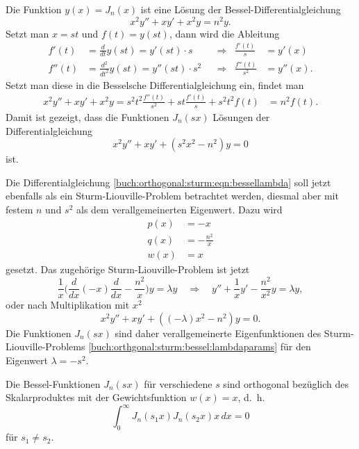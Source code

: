 Die Funktion $y(x) = J_n(x)$ ist eine Lösung der Bessel-Differentialgleichung
\[
x^2y'' + xy' + x^2y = n^2y.
\]
Setzt man $x=s t$ und $f(t)=y(s t)$, dann wird die Ableitung 
\[
\begin{aligned}
f'(t)
&=
\frac{d}{dt}y(s t)
=
y'(s t) \cdot s
&&\Rightarrow
&
\frac{f'(t)}{s}
&=
y'(x)
\\
f''(t)
&=
\frac{d^2}{dt^2} y(s t)
=
y''(s t) \cdot s^2
&&\Rightarrow
&
\frac{f''(t)}{s^2}
&=
y''(x).
\end{aligned}
\]
Setzt man diese in die Besselsche Differentialgleichung ein,
findet man
\begin{align*}
x^2y''+xy'+x^2y
=
s^2 t^2 \frac{f''(t)}{s^2}
+
s t \frac{f'(t)}{s}
+
s^2 t^2 f(t)
&=
n^2 f(t).
\end{align*}
Damit ist gezeigt, dass die Funktionen $J_n(s x)$ Lösungen
der Differentialgleichung
\begin{equation}
x^2y'' + xy' + (s^2 x^2  - n^2) y = 0
\label{buch:orthogonal:sturm:eqn:bessellambda}
\end{equation}
ist.

Die Differentialgleichung
\eqref{buch:orthogonal:sturm:eqn:bessellambda}
soll jetzt ebenfalls als ein Sturm-Liouville-Problem betrachtet
werden, diesmal aber mit festem $n$ und $s^2$ als dem verallgemeinerten
Eigenwert.
Dazu wird
\begin{equation}
\begin{aligned}
p(x) &= -x \\
q(x) &= -\frac{n^2}{x} \\
w(x) &= x
\end{aligned}
\label{buch:orthgonal:sturm:bessel:lambdaparams}
\end{equation}
gesetzt.
Das zugehörige Sturm-Liouville-Problem ist jetzt
\[
\frac{1}{x}\biggl(
\frac{d}{dx} (-x)\frac{d}{dx} -\frac{n^2}{x}
\biggr)
y
=
\lambda y
\quad\Rightarrow\quad
y'' + \frac{1}{x}y' - \frac{n^2}{x^2}y = \lambda y,
\]
oder nach Multiplikation mit $x^2$
\begin{equation}
x^2y'' + xy' + ((-\lambda)x^2 - n^2) y = 0.
\end{equation}
Die Funktionen $J_n(sx)$ sind daher verallgemeinerte Eigenfunktionen
des Sturm-Liouville-Problems
\eqref{buch:orthgonal:sturm:bessel:lambdaparams}
für den Eigenwert $\lambda = -s^2$.

\begin{satz}
Die Bessel-Funktionen $J_n(sx)$ für verschiedene $s$ sind orthogonal
bezüglich des Skalarproduktes mit der Gewichtsfunktion $w(x)=x$,
d.~h.
\[
\int_0^\infty J_n(s_1x) J_n(s_2x) x\,dx
=
0
\]
für $s_1\ne s_2$.
\end{satz}

